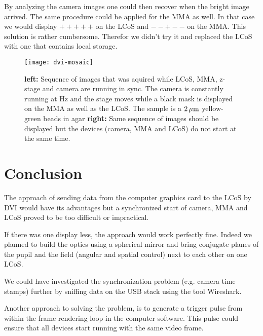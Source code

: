 By analyzing the camera images one could then recover when the bright
image arrived. The same procedure could be applied for the MMA as
well. In that case we would display $+++++$ on the LCoS and $--+--$ on
the MMA. This solution is rather cumbersome. Therefor we didn't try
it and replaced the LCoS with one that contains local storage.

\begin{figure}[!hbt]
  \centering
  \texttt{[image: dvi-mosaic]}
  \caption{{\bf left:} Sequence of images that was aquired while LCoS,
    MMA, z-stage and camera are running in sync. The camera is
    constantly running at \unit[30]{Hz} and the stage moves while a
    black mask is displayed on the MMA as well as the LCoS. The sample
    is a $\unit[2]{\mu m}$ yellow-green beads in agar {\bf right:}
    Same sequence of images should be displayed but the devices
    (camera, MMA and LCoS) do not start at the same time.}
  \label{fig:dvi-mosaic}
\end{figure}

\section{Conclusion}
The approach of sending data from the computer graphics card to the
LCoS by DVI would have its advantages but a synchronized start of
camera, MMA and LCoS proved to be too difficult or impractical.

If there was one display less, the approach would work perfectly fine.
Indeed we planned to build the optics using a spherical mirror and
bring conjugate planes of the pupil and the field (angular and spatial
control) next to each other on one LCoS.

We could have investigated the synchronization problem (e.g. camera
time stamps) further by sniffing data on the USB stack using the tool
Wireshark.

Another approach to solving the problem, is to generate a trigger
pulse from within the frame rendering loop in the computer
software. This pulse could ensure that all devices start running with
the same video frame.
